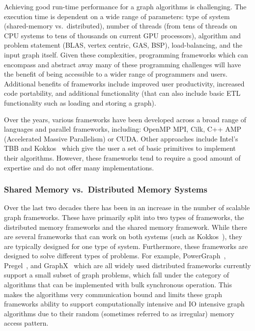 Achieving good run-time performance for a graph algorithms is challenging. %
The execution time is dependent on a wide range of parameters: type of system (shared-memory vs.\ distributed), number of threads (from tens of threads on CPU systems to tens of thousands on current GPU processors), algorithm and problem statement (BLAS, vertex centric, GAS, BSP), load-balancing, and the input graph itself.
Given these complexities, programming frameworks which can encompass and abstract away many of these programming challenges will have the benefit of being accessible to a wider range of programmers and users. Additional benefits of frameworks include improved user productivity, increased code portability, and additional functionality (that can also include basic ETL functionality such as loading and storing a graph).

Over the years, various frameworks have been developed across a broad range of languages and parallel frameworks, including: OpenMP MPI, Cilk, C++ AMP (Accelerated Massive Parallelism) or CUDA\@.  Other approaches include Intel's TBB and  Kokkos~\cite{edwards2014kokkos} which give the user a set of basic primitives to implement their algorithms. However, these frameworks tend to require a good amount of expertise and do not offer many implementations.



\subsubsection{Shared Memory vs.\ Distributed Memory Systems}
Over the last two decades there has been in an increase in the number of scalable graph frameworks. These have primarily split into two types of frameworks, the distributed memory frameworks and the shared memory framework. While there are several frameworks that can work on both systems (such as Kokkos~\cite{edwards2014kokkos}), they are typically designed for one type of system.  Furthermore, these frameworks are designed to solve different types of problems. For example, PowerGraph~\cite{powergraph}, Pregel~\cite{pregel}, and GraphX~\cite{gonzalez2014graphx} which are all widely used distributed frameworks currently support a small subset of graph problems, which fall under the category of algorithms that can be implemented with bulk synchronous operation. This makes the algorithms very communication bound and limits these graph frameworks ability to support computationally intensive and IO intensive graph algorithms due to their random (sometimes referred to as irregular) memory access pattern.

